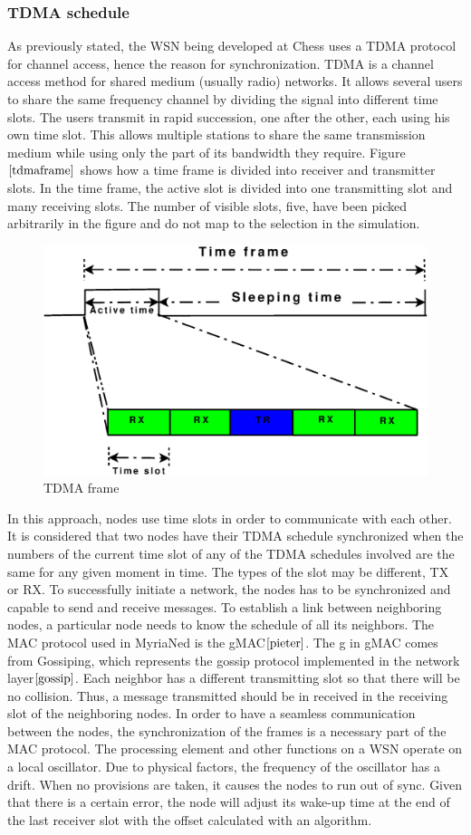 \documentclass[a4paper,10pt]{report}
\begin{document}
\subsubsection{TDMA schedule}
As previously stated, the WSN being developed at Chess uses a TDMA protocol for channel access, hence the reason for synchronization.
TDMA is a channel access method for shared medium (usually radio) networks. It allows several users to share the same frequency
channel by dividing the signal into different time slots. The users transmit in rapid succession, one after the other, each using his
own time slot. This allows multiple stations to share the same transmission medium while using only the part of its bandwidth they
require. Figure $\ref{tdmaframe}$ shows how a time frame is divided into receiver and transmitter slots. In the time frame, the active
slot is divided into one transmitting slot and many receiving slots. The number of visible slots, five, have been picked
arbitrarily in the figure and do not map to the selection in the simulation.
\begin{figure}
\centering
\includegraphics[width=0.6 \textwidth]{tdmaframe}
\caption{TDMA frame} \label{tdmaframe}
\end{figure}
\newline In this approach, nodes use time slots in order to communicate with each other. It is considered that two nodes have
their TDMA schedule synchronized when the numbers of the current time slot of any of the TDMA schedules involved are the same for any
given moment in time. The types of the slot may be different, TX or RX. To successfully initiate a network, the nodes has to be
synchronized and capable to send and receive messages. To establish a link between neighboring nodes, a particular node needs to know
the schedule of all its neighbors. The MAC protocol used in MyriaNed is the gMAC$\cite{pieter}$. The g in gMAC comes from Gossiping, which represents the gossip protocol implemented in the network layer$\cite{gossip}$.
\newline
Each neighbor has a different transmitting slot so that there will be no collision. Thus, a message transmitted should be in received in the receiving slot of the neighboring nodes. In order to have a seamless communication between the nodes, the synchronization of the frames is a necessary part of the MAC protocol. The processing element and other functions on a WSN operate on a local oscillator. Due to physical factors, the frequency of the oscillator has a drift. When no provisions are taken, it causes the nodes to run out of sync. Given that there is a certain error, the node will adjust its wake-up time at the end of the last receiver slot with the offset calculated with an algorithm. \newline
\end{document}
